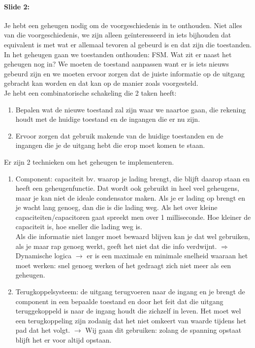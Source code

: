 \documentclass[10pt,a4paper]{book}
\begin{document}
\paragraph{Slide 2:} Je hebt een geheugen nodig om de voorgeschiedenis in te onthouden. Niet alles van die voorgeschiedenis, we zijn alleen ge\"interesseerd in iets bijhouden dat equivalent is met wat er allemaal tevoren al gebeurd is en dat zijn die toestanden. In het geheugen gaan we toestanden onthouden: FSM. Wat zit er naast het geheugen nog in? We moeten de toestand aanpassen want er is iets nieuws gebeurd zijn en we moeten ervoor zorgen dat de juiste informatie op de uitgang gebracht kan worden en dat kan op de manier zoals voorgesteld.\\
Je hebt een combinatorische schakeling die 2 taken heeft:
\begin{enumerate}
\item Bepalen wat de nieuwe toestand zal zijn waar we naartoe gaan, die rekening houdt met de huidige toestand en de ingangen die er nu zijn.	
\item Ervoor zorgen dat gebruik makende van de huidige toestanden en de ingangen die je de uitgang hebt die erop moet komen te staan.
\end{enumerate}	
Er zijn 2 technieken om het geheugen te implementeren.
\begin{enumerate}
\item Component: capaciteit bv. waarop je lading brengt, die blijft daarop staan en heeft een geheugenfunctie. Dat wordt ook gebruikt in heel veel geheugens, maar je kan niet de ideale condensator maken. Als je er lading op brengt en je wacht lang genoeg, dan die is die lading weg. Als het over kleine capaciteiten/capacitoren gaat spreekt men over 1 milliseconde. Hoe kleiner de capaciteit is, hoe sneller die lading weg is.\\
Als die informatie niet langer moet bewaard blijven kan je dat wel gebruiken, als je maar rap genoeg werkt, geeft het niet dat die info verdwijnt. $\Rightarrow$ Dynamische logica $\rightarrow$ er is een maximale en minimale snelheid waaraan het moet werken: snel genoeg werken of het gedraagt zich niet meer als een geheugen.	
\item Terugkoppelsysteem: de uitgang terugvoeren naar de ingang en je brengt de component in een bepaalde toestand en door het feit dat die uitgang teruggekoppeld is naar de ingang houdt die zichzelf in leven. Het moet wel een terugkoppeling zijn zodanig dat het niet omkeert van waarde tijdens het pad dat het volgt. $\rightarrow$ Wij gaan dit gebruiken: zolang de spanning opstaat blijft het er voor altijd opstaan.
\end{enumerate}
\end{document}
